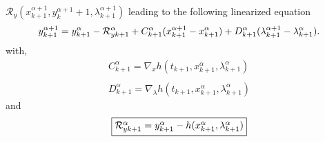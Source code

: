 $\mathcal R_y(x^{\alpha+1}_{k+1},y^{\alpha+1}_k+1,\lambda^{\alpha+1}_{k+1})$ leading to the following linearized equation
\begin{equation}
  y^{\alpha+1}_{k+1} =  y^{\alpha}_{k+1}
  -\mathcal R^{\alpha}_{yk+1}+ \\
  C^{\alpha}_{k+1}(x^{\alpha+1}_{k+1}-x^{\alpha}_{k+1}) +
  D^{\alpha}_{k+1}(\lambda^{\alpha+1}_{k+1}-\lambda^{\alpha}_{k+1}). \label{eq:NL11y}
\end{equation}
with,
\begin{equation}
     \begin{array}{l}
  C^{\alpha}_{k+1} = \nabla_xh(t_{k+1}, x^{\alpha}_{k+1},\lambda^{\alpha}_{k+1} ) \\ \\
  D^{\alpha}_{k+1} = \nabla_{\lambda}h(t_{k+1}, x^{\alpha}_{k+1},\lambda^{\alpha}_{k+1})
 \end{array}
\end{equation}
and
\begin{equation}\fbox{$
\mathcal R^{\alpha}_{yk+1} = y^{\alpha}_{k+1} - h(x^{\alpha}_{k+1},\lambda^{\alpha}_{k+1})$}
 \end{equation}

